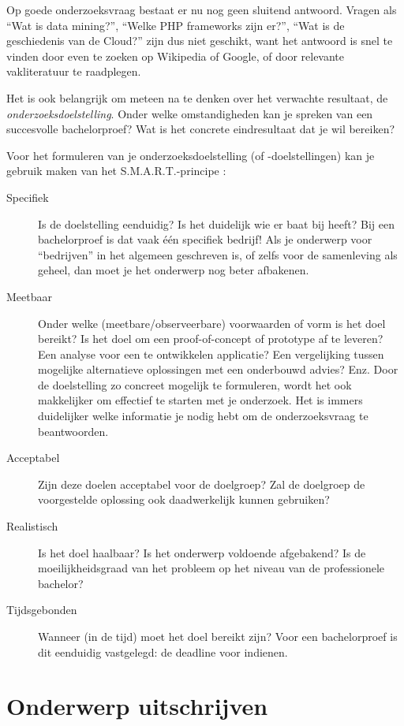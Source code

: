 Op goede onderzoeksvraag bestaat er nu nog geen sluitend antwoord. Vragen als ``Wat is data mining?'', ``Welke PHP frameworks zijn er?'', ``Wat is de geschiedenis van de Cloud?'' zijn dus niet geschikt, want het antwoord is snel te vinden door even te zoeken op Wikipedia of Google, of door relevante vakliteratuur te raadplegen.

Het is ook belangrijk om meteen na te denken over het verwachte resultaat, de \textit{onderzoeksdoelstelling}. Onder welke omstandigheden kan je spreken van een succesvolle bachelorproef? Wat is het concrete eindresultaat dat je wil bereiken?

Voor het formuleren van je onderzoeksdoelstelling (of -doelstellingen) kan je gebruik maken van het S.M.A.R.T.-principe \autocite{UchelenJungjohann2003}:

\begin{description}
  \item[Specifiek] Is de doelstelling eenduidig? Is het duidelijk wie er baat bij heeft? Bij een bachelorproef is dat vaak één specifiek bedrijf! Als je onderwerp voor ``bedrijven'' in het algemeen geschreven is, of zelfs voor de samenleving als geheel, dan moet je het onderwerp nog beter afbakenen.
  \item[Meetbaar] Onder welke (meetbare/observeerbare) voorwaarden of vorm is het doel bereikt? Is het doel om een proof-of-concept of prototype af te leveren? Een analyse voor een te ontwikkelen applicatie? Een vergelijking tussen mogelijke alternatieve oplossingen met een onderbouwd advies? Enz. Door de doelstelling zo concreet mogelijk te formuleren, wordt het ook makkelijker om effectief te starten met je onderzoek. Het is immers duidelijker welke informatie je nodig hebt om de onderzoeksvraag te beantwoorden.
  \item[Acceptabel] Zijn deze doelen acceptabel voor de doelgroep? Zal de doelgroep de voorgestelde oplossing ook daadwerkelijk kunnen gebruiken?
  \item[Realistisch] Is het doel haalbaar? Is het onderwerp voldoende afgebakend? Is de moeilijkheidsgraad van het probleem op het niveau van de professionele bachelor?
  \item[Tijdsgebonden] Wanneer (in de tijd) moet het doel bereikt zijn? Voor een bachelorproef is dit eenduidig vastgelegd: de deadline voor indienen.
\end{description}

\section{Onderwerp uitschrijven}%
\label{sec:onderwerp_uitschrijven}

